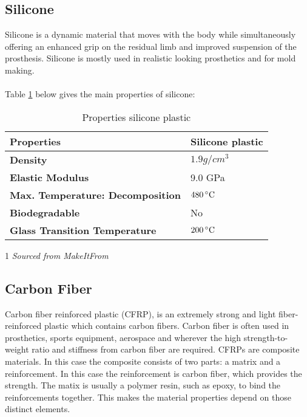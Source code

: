 \documentclass[11pt, a4paper]{article}
\begin{document}
\subsection{Silicone}
Silicone is a dynamic material that moves with the body while simultaneously offering 
an enhanced grip on the residual limb and improved suspension of the prosthesis.
Silicone is mostly used in realistic looking prosthetics and for mold making.
\\ \\ 
Table \ref{tab:silicone-properties} below gives the main properties of silicone:
\begin{table}[ht]
    \centering
    \begin{threeparttable}
        \begin{tabular}[t]{>{\bfseries}l l}
            \toprule
            Properties\tnote{1} & \textbf{Silicone plastic}  \\
            \midrule
            Density & $1.9 g/cm^3$  \\
            Elastic Modulus & 9.0 GPa \\ %
            Max. Temperature: Decomposition & $480\,^{\circ}{\rm C}$  \\
            Biodegradable & No  \\
            Glass Transition Temperature & $200\,^{\circ}{\rm C}$  \\ %
            \bottomrule
        \end{tabular}
        \caption{Properties silicone plastic}
        \label{tab:silicone-properties}
        \begin{tablenotes}
            \item[1] \textit{Sourced from MakeItFrom \cite{MakeItFrom}}
        \end{tablenotes}    
    \end{threeparttable}    
\end{table}

\subsection{Carbon Fiber}
Carbon fiber reinforced plastic (CFRP), is an extremely strong and light fiber-reinforced plastic which contains carbon fibers.
Carbon fiber is often used in prosthetics, sports equipment, aerospace and wherever the high strength-to-weight ratio and stiffness from carbon fiber are required.
CFRPs are composite materials.
In this case the composite consists of two parts: a matrix and a reinforcement.
In this case the reinforcement is carbon fiber, which provides the strength.
The matix is usually a polymer resin, such as epoxy, to bind the reinforcements together.
This makes the material properties depend on those distinct elements.
\end{document}
